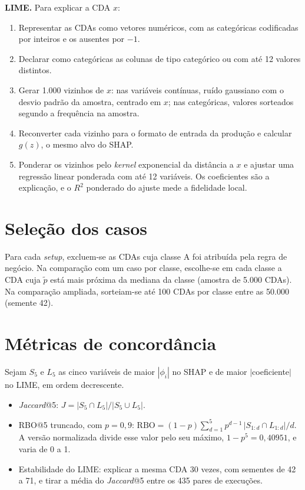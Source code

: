 \begin{apendicesenv}
\textbf{LIME.} Para explicar a CDA $x$:
\begin{enumerate}
    \item Representar as CDAs como vetores numéricos, com as categóricas codificadas por inteiros e os ausentes por $-1$.
    \item Declarar como categóricas as colunas de tipo categórico ou com até 12 valores distintos.
    \item Gerar 1.000 vizinhos de $x$: nas variáveis contínuas, ruído gaussiano com o desvio padrão da amostra, centrado em $x$; nas categóricas, valores sorteados segundo a frequência na amostra.
    \item Reconverter cada vizinho para o formato de entrada da produção e calcular $g(z)$, o mesmo alvo do SHAP.
    \item Ponderar os vizinhos pelo \textit{kernel} exponencial da distância a $x$ e ajustar uma regressão linear ponderada com até 12 variáveis. Os coeficientes são a explicação, e o $R^2$ ponderado do ajuste mede a fidelidade local.
\end{enumerate}

\section{Seleção dos casos}
\label{ap:alg_casos}

Para cada \textit{setup}, excluem-se as CDAs cuja classe A foi atribuída pela regra de negócio. Na comparação com um caso por classe, escolhe-se em cada classe a CDA cuja $\tilde{p}$ está mais próxima da mediana da classe (amostra de 5.000 CDAs). Na comparação ampliada, sorteiam-se até 100 CDAs por classe entre as 50.000 (semente 42).

\section{Métricas de concordância}
\label{ap:alg_concordancia}

Sejam $S_5$ e $L_5$ as cinco variáveis de maior $|\phi_i|$ no SHAP e de maior $|$coeficiente$|$ no LIME, em ordem decrescente.

\begin{itemize}
    \item \textit{Jaccard}@5: $J = |S_5 \cap L_5| / |S_5 \cup L_5|$.
    \item RBO@5 truncado, com $p = 0{,}9$: $\mathrm{RBO} = (1 - p)\sum_{d=1}^{5} p^{d-1}\,|S_{1:d} \cap L_{1:d}|/d$. A versão normalizada divide esse valor pelo seu máximo, $1 - p^5 = 0{,}40951$, e varia de 0 a 1.
    \item Estabilidade do LIME: explicar a mesma CDA 30 vezes, com sementes de 42 a 71, e tirar a média do \textit{Jaccard}@5 entre os 435 pares de execuções.
\end{itemize}


\end{apendicesenv}

